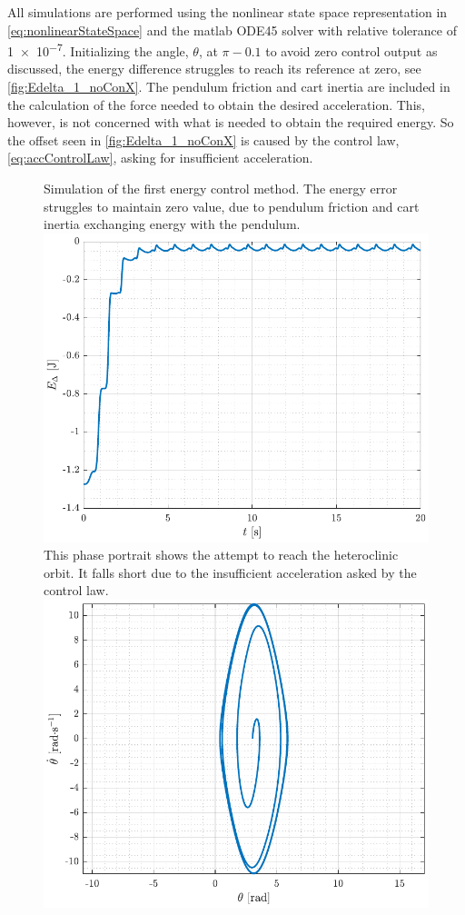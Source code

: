 All simulations are performed using the nonlinear state space representation in \autoref{eq:nonlinearStateSpace} and the matlab ODE45 solver with relative tolerance of \SI{1e-7}{}. Initializing the angle, $\theta$, at $\pi-0.1$ to avoid zero control output as discussed, the energy difference struggles to reach its reference at zero, see \autoref{fig:Edelta_1_noConX}. The pendulum friction and cart inertia are included in the calculation of the force needed to obtain the desired acceleration. This, however, is not concerned with what is needed to obtain the required energy. So the offset seen in \autoref{fig:Edelta_1_noConX} is caused by the control law, \autoref{eq:accControlLaw}, asking for insufficient acceleration.
%
\begin{figure}[H]
  \hspace{-10pt}
  \captionbox
  {
    Simulation of the first energy control method. The energy error struggles to maintain zero value, due to pendulum friction and cart inertia exchanging energy with the pendulum.
    \label{fig:Edelta_1_noConX}
  }
  {
    \hspace{-1cm}
    \includegraphics[width=.46\textwidth]{figures/Edelta_1_noConX}
  }
  \hspace{20pt}
  \captionbox 
  {
    This phase portrait shows the attempt to reach the heteroclinic orbit. It falls short due to the insufficient acceleration asked by the control law.
    \label{fig:phase_1_noConX}
  }
  {
    \hspace{-1cm}
    \includegraphics[width=.46\textwidth]{figures/phase_1_noConX}
  }  
\end{figure}
